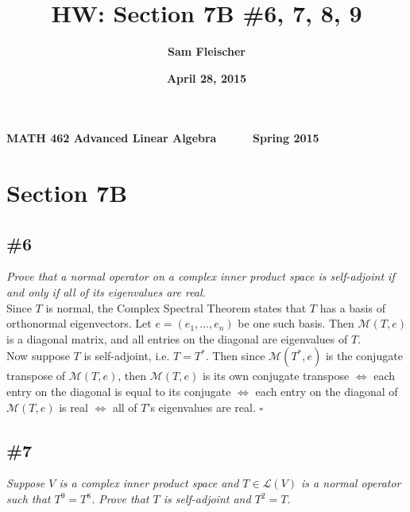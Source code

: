 \documentclass[12pt]{article}
\title{\bf HW: Section 7B \#6, 7, 8, 9}
\author{\bf Sam Fleischer}
\date{\bf April 28, 2015}
\begin{document}
{\bf MATH 462 \hfill Advanced Linear Algebra \ \ \ \ \ \hfill Spring 2015} 

{\let\newpage\relax\maketitle}

\section*{Section 7B}
\subsection*{\#6}
{\it Prove that a normal operator on a complex inner product space is self-adjoint if and only if all of its eigenvalues are real.} \\

\noindent Since $T$ is normal, the Complex Spectral Theorem states that $T$ has a basis of orthonormal eigenvectors.  Let $e = (e_1, \dots, e_n)$ be one such basis.  Then $\mathcal{M}(T, e)$ is a diagonal matrix, and all entries on the diagonal are eigenvalues of $T$. \\

\noindent Now suppose $T$ is self-adjoint, i.e. $T = T^*$.  Then since $\mathcal{M}(T^*, e)$ is the conjugate transpose of $\mathcal{M}(T, e)$, then $\mathcal{M}(T, e)$ is its own conjugate transpose $\iff$ each entry on the diagonal is equal to its conjugate $\iff$ each entry on the diagonal of $\mathcal{M}(T, e)$ is real $\iff$ all of $T$'s eigenvalues are real. \hfill $\square$

\subsection*{\#7}
{\it Suppose $V$ is a complex inner product space and $T \in \mathcal{L}(V)$ is a normal operator such that $T^9 = T^8$.  Prove that $T$ is self-adjoint and $T^2 = T$.} \\
\end{document}
